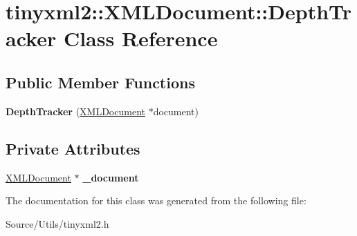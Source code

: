 \hypertarget{classtinyxml2_1_1_x_m_l_document_1_1_depth_tracker}{}\section{tinyxml2\+:\+:X\+M\+L\+Document\+:\+:Depth\+Tracker Class Reference}
\label{classtinyxml2_1_1_x_m_l_document_1_1_depth_tracker}
\subsection*{Public Member Functions}
\begin{DoxyCompactItemize}
\item 
\mbox{\label{classtinyxml2_1_1_x_m_l_document_1_1_depth_tracker_ac2782a163c2da773b84cb2c610b79bcb}} 
{\bfseries Depth\+Tracker} (\mbox{\hyperlink{classtinyxml2_1_1_x_m_l_document}{X\+M\+L\+Document}} $\ast$document)
\end{DoxyCompactItemize}
\subsection*{Private Attributes}
\begin{DoxyCompactItemize}
\item 
\mbox{\label{classtinyxml2_1_1_x_m_l_document_1_1_depth_tracker_ab142a47709c83a3698af1470378b9385}} 
\mbox{\hyperlink{classtinyxml2_1_1_x_m_l_document}{X\+M\+L\+Document}} $\ast$ {\bfseries \+\_\+document}
\end{DoxyCompactItemize}


The documentation for this class was generated from the following file\+:\begin{DoxyCompactItemize}
\item 
Source/\+Utils/tinyxml2.\+h\end{DoxyCompactItemize}
